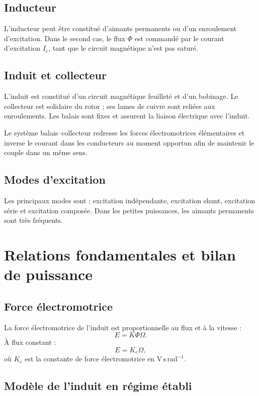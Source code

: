 \subsection{Inducteur}

L'inducteur peut être constitué d'aimants permanents ou d'un enroulement d'excitation. Dans le
second cas, le flux $\Phi$ est commandé par le courant d'excitation $I_e$, tant que le circuit
magnétique n'est pas saturé.

\subsection{Induit et collecteur}

L'induit est constitué d'un circuit magnétique feuilleté et d'un bobinage. Le collecteur est
solidaire du rotor ; ses lames de cuivre sont reliées aux enroulements. Les balais sont fixes et
assurent la liaison électrique avec l'induit.

Le système balais--collecteur redresse les forces électromotrices élémentaires et inverse le
courant dans les conducteurs au moment opportun afin de maintenir le couple dans un même sens.

\subsection{Modes d'excitation}

Les principaux modes sont : excitation indépendante, excitation shunt, excitation série et
excitation composée. Dans les petites puissances, les aimants permanents sont très fréquents.

\section{Relations fondamentales et bilan de puissance}\label{sec:mcc-relations}

\subsection{Force électromotrice}

La force électromotrice de l'induit est proportionnelle au flux et à la vitesse :
\[
E=K\Phi\Omega.
\]
À flux constant :
\[
E=K_e\Omega,
\]
où $K_e$ est la constante de force électromotrice en $\mathrm{V\,s\,rad^{-1}}$.

\subsection{Modèle de l'induit en régime établi}

